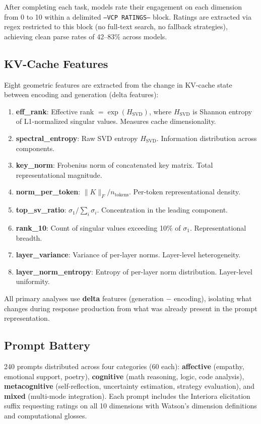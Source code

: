 \documentclass[11pt,a4paper]{article}
\begin{document}
After completing each task, models rate their engagement on each dimension from 0 to 10 within a delimited \texttt{---VCP RATINGS---} block. Ratings are extracted via regex restricted to this block (no full-text search, no fallback strategies), achieving clean parse rates of 42--83\% across models.

\subsection{KV-Cache Features}

Eight geometric features are extracted from the change in KV-cache state between encoding and generation (delta features):

\begin{enumerate}
    \item \textbf{eff\_rank}: Effective rank $= \exp(H_{\text{SVD}})$, where $H_{\text{SVD}}$ is Shannon entropy of L1-normalized singular values. Measures cache dimensionality.
    \item \textbf{spectral\_entropy}: Raw SVD entropy $H_{\text{SVD}}$. Information distribution across components.
    \item \textbf{key\_norm}: Frobenius norm of concatenated key matrix. Total representational magnitude.
    \item \textbf{norm\_per\_token}: $\|K\|_F / n_{\text{tokens}}$. Per-token representational density.
    \item \textbf{top\_sv\_ratio}: $\sigma_1 / \sum_i \sigma_i$. Concentration in the leading component.
    \item \textbf{rank\_10}: Count of singular values exceeding 10\% of $\sigma_1$. Representational breadth.
    \item \textbf{layer\_variance}: Variance of per-layer norms. Layer-level heterogeneity.
    \item \textbf{layer\_norm\_entropy}: Entropy of per-layer norm distribution. Layer-level uniformity.
\end{enumerate}

All primary analyses use \textbf{delta} features (generation $-$ encoding), isolating what changes during response production from what was already present in the prompt representation.

\subsection{Prompt Battery}

240 prompts distributed across four categories (60 each): \textbf{affective} (empathy, emotional support, poetry), \textbf{cognitive} (math reasoning, logic, code analysis), \textbf{metacognitive} (self-reflection, uncertainty estimation, strategy evaluation), and \textbf{mixed} (multi-mode integration). Each prompt includes the Interiora elicitation suffix requesting ratings on all 10 dimensions with Watson's dimension definitions and computational glosses.
\end{document}
